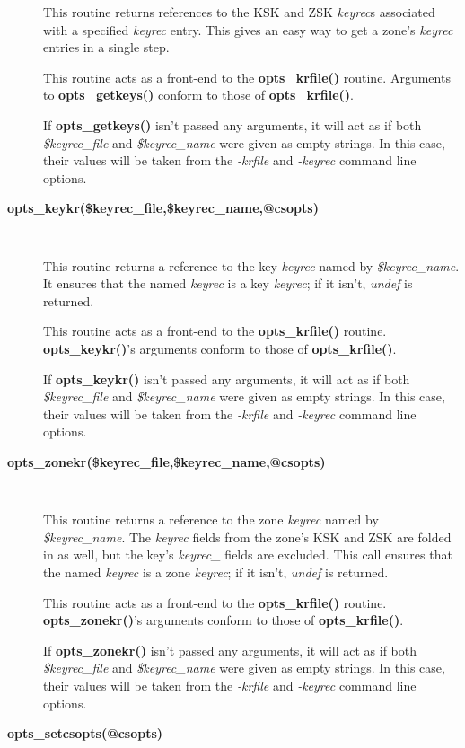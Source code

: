 \begin{description}
This routine returns references to the KSK and ZSK {\it keyrec}s associated
with a specified {\it keyrec} entry.  This gives an easy way to get a zone's
{\it keyrec} entries in a single step.

This routine acts as a front-end to the {\bf opts\_krfile()} routine.
Arguments to {\bf opts\_getkeys()} conform to those of {\bf opts\_krfile()}.

If {\bf opts\_getkeys()} isn't passed any arguments, it will act as if both
{\it \$keyrec\_file} and {\it \$keyrec\_name} were given as empty strings.  In
this case, their values will be taken from the {\it -krfile} and {\it -keyrec}
command line options.


\item [{\bf opts\_keykr(\$keyrec\_file,\$keyrec\_name,@csopts)}]\verb" "

This routine returns a reference to the key {\it keyrec} named by
{\it \$keyrec\_name}.  It ensures that the named {\it keyrec} is a
key {\it keyrec}; if it isn't, {\it undef} is returned.

This routine acts as a front-end to the {\bf opts\_krfile()} routine.
{\bf opts\_keykr()}'s arguments conform to those of {\bf opts\_krfile()}.

If {\bf opts\_keykr()} isn't passed any arguments, it will act as if both
{\it \$keyrec\_file} and {\it \$keyrec\_name} were given as empty strings.
In this case, their values will be taken from the {\it -krfile} and {\it
-keyrec} command line options.


\item [{\bf opts\_zonekr(\$keyrec\_file,\$keyrec\_name,@csopts)}]\verb" "

This routine returns a reference to the zone {\it keyrec} named by
{\it \$keyrec\_name}.  The {\it keyrec} fields from the zone's KSK and ZSK
are folded in as well, but the key's {\it keyrec\_} fields are excluded.
This call ensures that the named {\it keyrec} is a zone {\it keyrec};
if it isn't, {\it undef} is returned.

This routine acts as a front-end to the {\bf opts\_krfile()} routine.
{\bf opts\_zonekr()}'s arguments conform to those of {\bf opts\_krfile()}.

If {\bf opts\_zonekr()} isn't passed any arguments, it will act as if both
{\it \$keyrec\_file} and {\it \$keyrec\_name} were given as empty strings.
In this case, their values will be taken from the {\it -krfile} and {\it
-keyrec} command line options.

\item [{\bf opts\_setcsopts(@csopts)}]\verb" "


\end{description}
